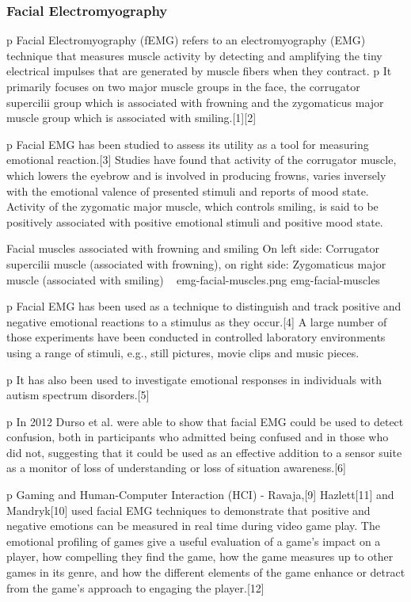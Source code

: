 
\subsubsection{Facial Electromyography}

p Facial Electromyography (fEMG) refers to an electromyography (EMG) technique that measures muscle activity by detecting and amplifying the tiny electrical impulses that are generated by muscle fibers when they contract.
p It primarily focuses on two major muscle groups in the face, the corrugator supercilii group which is associated with frowning and the zygomaticus major muscle group which is associated with smiling.[1][2]

p Facial EMG has been studied to assess its utility as a tool for measuring emotional reaction.[3] Studies have found that activity of the corrugator muscle, which lowers the eyebrow and is involved in producing frowns, varies inversely with the emotional valence of presented stimuli and reports of mood state. Activity of the zygomatic major muscle, which controls smiling, is said to be positively associated with positive emotional stimuli and positive mood state.

\img
{Facial muscles associated with frowning and smiling}
{On left side: Corrugator supercilii muscle (associated with frowning), on right side: Zygomaticus major muscle (associated with smiling) ~\cite{wiki2014facial}}
{emg-facial-muscles.png}
{emg-facial-muscles}

p Facial EMG has been used as a technique to distinguish and track positive and negative emotional reactions to a stimulus as they occur.[4] A large number of those experiments have been conducted in controlled laboratory environments using a range of stimuli, e.g., still pictures, movie clips and music pieces.

p It has also been used to investigate emotional responses in individuals with autism spectrum disorders.[5]

p In 2012 Durso et al. were able to show that facial EMG could be used to detect confusion, both in participants who admitted being confused and in those who did not, suggesting that it could be used as an effective addition to a sensor suite as a monitor of loss of understanding or loss of situation awareness.[6]

p Gaming and Human-Computer Interaction (HCI) - Ravaja,[9] Hazlett[11] and Mandryk[10] used facial EMG techniques to demonstrate that positive and negative emotions can be measured in real time during video game play. The emotional profiling of games give a useful evaluation of a game's impact on a player, how compelling they find the game, how the game measures up to other games in its genre, and how the different elements of the game enhance or detract from the game's approach to engaging the player.[12]


